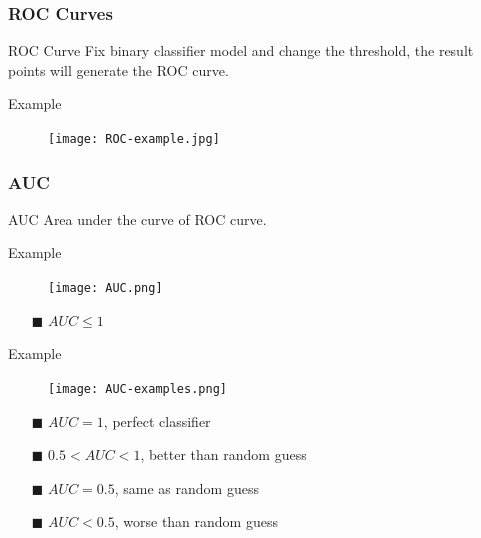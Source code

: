 \documentclass{beamer}
\begin{document}
\begin{frame}
    \frametitle{ROC Curves}
    \begin{block}{ROC Curve}
        Fix binary classifier model and change the threshold, the result points will generate the ROC curve.
    \end{block}
    \begin{exampleblock}{Example}
        \begin{figure}[h]
            \centering
            \texttt{[image: ROC-example.jpg]}    
        \end{figure}    
    \end{exampleblock}
\end{frame}

\begin{frame}
    \frametitle{AUC}
    \begin{block}{AUC}
        Area under the curve of ROC curve.
    \end{block}
    \begin{exampleblock}{Example}
        \begin{figure}[h]
            \centering
            \texttt{[image: AUC.png]} 
        \end{figure}    
    \end{exampleblock}
    \begin{itemize}
        \item[$\blacksquare$] $AUC \leqslant 1$
    \end{itemize}
\end{frame}

\begin{frame}
    \begin{exampleblock}{Example}
        \begin{figure}[h]
            \centering
            \texttt{[image: AUC-examples.png]}
        \end{figure}    
    \end{exampleblock}
    
    \begin{itemize}
        \item[$\blacksquare$] $AUC = 1$, perfect classifier
        \item[$\blacksquare$] $0.5 < AUC < 1$, better than random guess
        \item[$\blacksquare$] $AUC = 0.5$, same as random guess
        \item[$\blacksquare$] $AUC < 0.5$, worse than random guess
    \end{itemize}
\end{frame}
\end{document}

